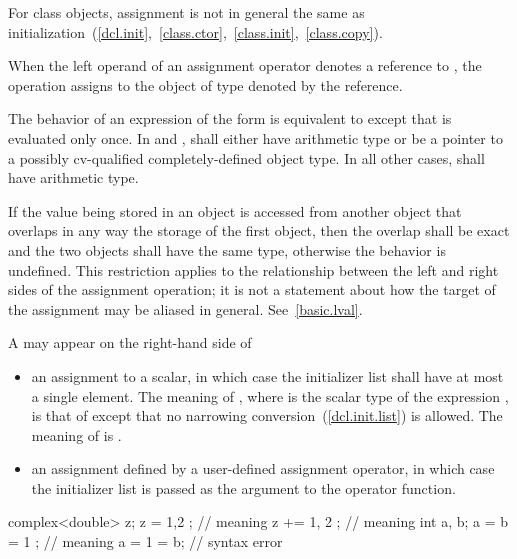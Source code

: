 \pnum
\enternote 
For class objects, assignment is not in general the same as
initialization~(\ref{dcl.init},~\ref{class.ctor},~\ref{class.init},~\ref{class.copy}).
\exitnote 

\pnum
{}%
When the left operand of an assignment operator denotes a reference to
, the operation assigns to the object of type  denoted
by the reference.

\pnum
The behavior of an expression of the form  \tcode{=}
 is equivalent to    except
that  is evaluated only once. In \tcode{+=} and \tcode{-=},
 shall either have arithmetic type or be a pointer to a
possibly cv-qualified completely-defined object type. In all other
cases,  shall have arithmetic type.

\pnum
If the value being stored in an object is accessed from another object that
overlaps in any way the storage of the first object, then the overlap shall be
exact and the two objects shall have the same type, otherwise the behavior is
undefined. \enternote This restriction applies to the relationship
between the left and right sides of the assignment operation; it is not a
statement about how the target of the assignment may be aliased in general.
See~\ref{basic.lval}. \exitnote

\pnum
A  may appear on the right-hand side of

\begin{itemize}
\item an assignment to a scalar, in which case the initializer list shall have
at most a single element. The meaning of , where  is the
scalar type of the expression , is that of  except that
no narrowing conversion~(\ref{dcl.init.list}) is allowed. The meaning of
 is .

\item an assignment defined by a user-defined assignment operator, in which case
the initializer list is passed as the argument to the operator function.
\end{itemize}

\enterexample
\begin{codeblock}
complex<double> z;
z = { 1,2 };              // meaning 
z += { 1, 2 };            // meaning 
int a, b;
a = b = { 1 };            // meaning 
a = { 1 } = b;            // syntax error
\end{codeblock}
\exitexample


